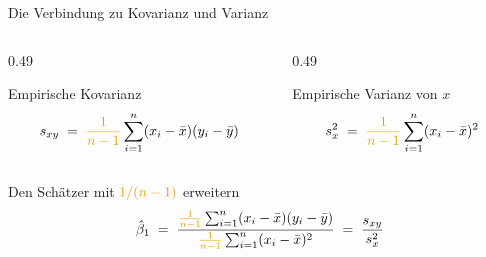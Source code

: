 \documentclass[aspectratio=169,11pt]{beamer}
\begin{document}
\begin{frame}{Die Verbindung zu Kovarianz und Varianz}
  \begin{columns}[T]
    \begin{column}{0.49\textwidth}
      \begin{block}{Empirische Kovarianz}
        \[
          s_{xy} \;=\; {\color{hsbiaccent}\frac{1}{n-1}}
          \sum_{i=1}^{n} (x_i - \bar{x})(y_i - \bar{y})
        \]
      \end{block}
    \end{column}
    \begin{column}{0.49\textwidth}
      \begin{block}{Empirische Varianz von $x$}
        \[
          s_x^{2} \;=\; {\color{hsbiaccent}\frac{1}{n-1}}
          \sum_{i=1}^{n} (x_i - \bar{x})^{2}
        \]
      \end{block}
    \end{column}
  \end{columns}

  \begin{block}{Den Schätzer mit ${\color{hsbiaccent}1/(n-1)}$ erweitern}
    \[
      \hat{\beta}_1
      \;=\;
      \frac{{\color{hsbiaccent}\frac{1}{n-1}}\sum_{i=1}^{n}(x_i-\bar{x})(y_i-\bar{y})}
           {{\color{hsbiaccent}\frac{1}{n-1}}\sum_{i=1}^{n}(x_i-\bar{x})^{2}}
      \;=\;
      \frac{s_{xy}}{s_x^{2}}
    \]
  \end{block}
  \vspace{-4pt}
  \begin{center}
  \end{center}
\end{frame}
\end{document}
